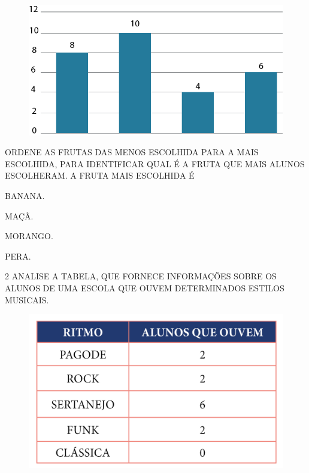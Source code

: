 \begin{figure}[H]
\centering
\includegraphics[width=\textwidth]{./media/SAEB_1ANO_MAT_FIGURA109.png}
\end{figure}

ORDENE AS FRUTAS DAS MENOS ESCOLHIDA PARA A MAIS ESCOLHIDA, PARA IDENTIFICAR QUAL É A FRUTA QUE MAIS ALUNOS ESCOLHERAM. A FRUTA MAIS ESCOLHIDA É

\begin{escolha}
\item BANANA.

\item MAÇÃ.

\item MORANGO.

\item PERA.
\end{escolha}

\num{2} ANALISE A TABELA, QUE FORNECE INFORMAÇÕES SOBRE OS ALUNOS DE UMA ESCOLA QUE OUVEM DETERMINADOS ESTILOS MUSICAIS.

\begin{figure}[H]
\centering
\includegraphics[width=\textwidth]{./media/SAEB_1ANO_MAT_FIGURA110.png}
\end{figure}

